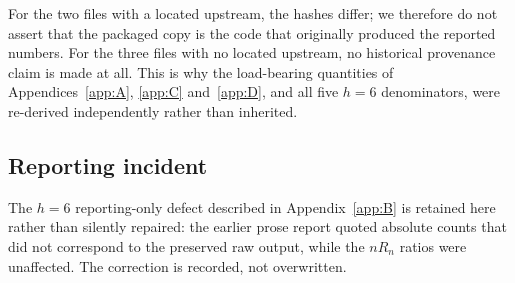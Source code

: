 For the two files with a located upstream, the hashes differ; we therefore do
not assert that the packaged copy is the code that originally produced the
reported numbers. For the three files with no located upstream, no historical
provenance claim is made at all. This is why the load-bearing quantities of
Appendices~\ref{app:A}, \ref{app:C} and~\ref{app:D}, and all five \(h=6\)
denominators, were re-derived independently rather than inherited.

\subsection*{Reporting incident}

The \(h=6\) reporting-only defect described in Appendix~\ref{app:B} is
retained here rather than silently repaired: the earlier prose report quoted
absolute counts that did not correspond to the preserved raw output, while the
\(nR_n\) ratios were unaffected. The correction is recorded, not overwritten.

